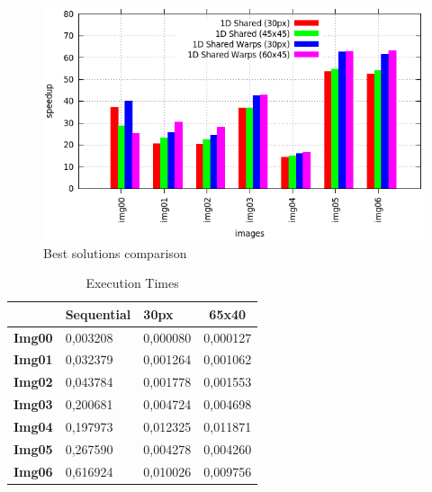 \documentclass[a4paper]{article}
\begin{document}
\begin{figure}[!ht]
    \centering
    \includegraphics[width=0.7\linewidth]{res/new/histogram_more_confronto}
    \caption{Best solutions comparison}
    \label{fig:dbsc}
\end{figure}
\FloatBarrier

\begin{table}[!ht]
\centering
\begin{tabular}{|l|l|l|l|}
\hline
\multicolumn{1}{|c|}{\textbf{}}      & \textbf{Sequential} & \textbf{30px}                 & \multicolumn{1}{c|}{\textbf{65x40}} \\ \hline
\multicolumn{1}{|c|}{\textbf{Img00}} & 0,003208            & \multicolumn{1}{c|}{0,000080} & \multicolumn{1}{c|}{0,000127}       \\ \hline
\textbf{Img01}                       & 0,032379            & 0,001264                      & 0,001062                            \\ \hline
\textbf{Img02}                       & 0,043784            & 0,001778                      & 0,001553                            \\ \hline
\textbf{Img03}                       & 0,200681            & 0,004724                      & 0,004698                            \\ \hline
\textbf{Img04}                       & 0,197973            & 0,012325                      & 0,011871                            \\ \hline
\textbf{Img05}                       & 0,267590            & 0,004278                      & 0,004260                            \\ \hline
\textbf{Img06}                       & 0,616924            & 0,010026                      & 0,009756                            \\ \hline
\end{tabular}
\caption{Execution Times}
\label{tab:histo_exe}
\end{table}
\FloatBarrier
\end{document}
